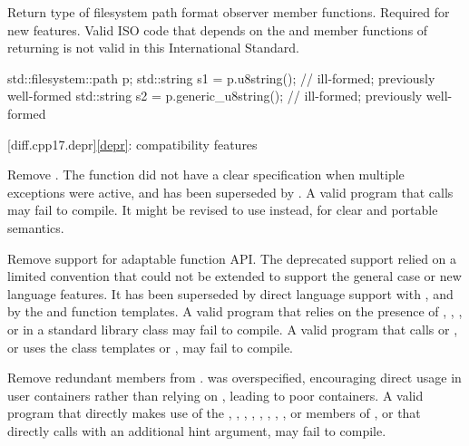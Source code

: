 \change
Return type of filesystem path format observer member functions.
\rationale
Required for new features.
\effect
Valid ISO \CppXVII{} code that depends on the  and
 member functions of 
returning  is not valid in this International Standard.
\begin{codeblock}
std::filesystem::path p;
std::string s1 = p.u8string();          // ill-formed; previously well-formed
std::string s2 = p.generic_u8string();  // ill-formed; previously well-formed
\end{codeblock}

[diff.cpp17.depr]{\ref{depr}: compatibility features}

\nodiffref
\change
Remove .
\rationale
The function did not have a clear specification when multiple exceptions were
active, and has been superseded by .
\effect
A valid \CppXVII{} program that calls  may fail
to compile. It might be revised to use  instead,
for clear and portable semantics.

\nodiffref
\change
Remove support for adaptable function API.
\rationale
The deprecated support relied on a limited convention that could not be
extended to support the general case or new language features. It has been
superseded by direct language support with , and by the
 and  function templates.
\effect
A valid \CppXVII{} program that relies on the presence of ,
, , or
 in a standard library class may fail to compile. A
valid \CppXVII{} program that calls  or , or uses the
class templates  or , may fail to
compile.

\nodiffref
\change
Remove redundant members from .
\rationale
{} was overspecified, encouraging direct usage in user containers
rather than relying on , leading to poor containers.
\effect
A valid \CppXVII{} program that directly makes use of the ,
, , ,
, , , , or
 members of , or that directly calls
 with an additional hint argument, may fail to compile.

